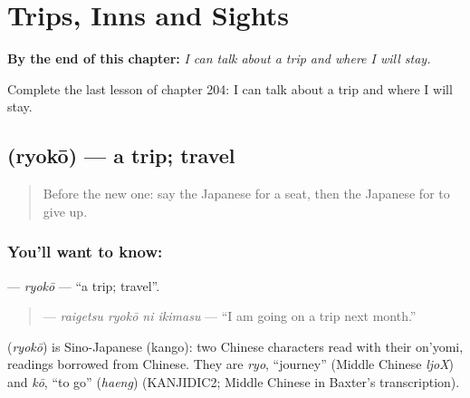 
\chapter{Trips, Inns and Sights}
\label{ch:ja-trips-inns-and-sights}

\begin{chapteropening}
\textbf{By the end of this chapter:} \emph{I can talk about a trip and where I will stay.}

Complete the last lesson of chapter 204: I can talk about a trip and where I will stay.
\end{chapteropening}

\section[\texorpdfstring{\ja{りょこう} (ryokō)}{りょこう (ryokō)}]{ (ryokō) — a trip; travel}

\label{lesson:JA-C204-ryokou}



\begin{quote}
Before the new one: say the Japanese for a seat, then the Japanese for to give up.
\end{quote}

\subsection*{You'll want to know: }
\textbf{} — \emph{ryokō} — \textquotedblleft{}a trip; travel\textquotedblright{}.

\begin{quote}
\textbf{  } — \emph{raigetsu ryokō ni ikimasu} — \textquotedblleft{}I am going on a trip next month.\textquotedblright{}
\end{quote}

\begin{cousinweb}
\textbf{} (\emph{ryokō}) is Sino-Japanese (kango): two Chinese characters read with their on'yomi, readings borrowed from Chinese. They are \emph{ryo}, \textquotedblleft{}journey\textquotedblright{} (Middle Chinese \emph{ljoX}) and \emph{kō}, \textquotedblleft{}to go\textquotedblright{} (\emph{haeng}) (KANJIDIC2; Middle Chinese in Baxter's transcription).
\end{cousinweb}

